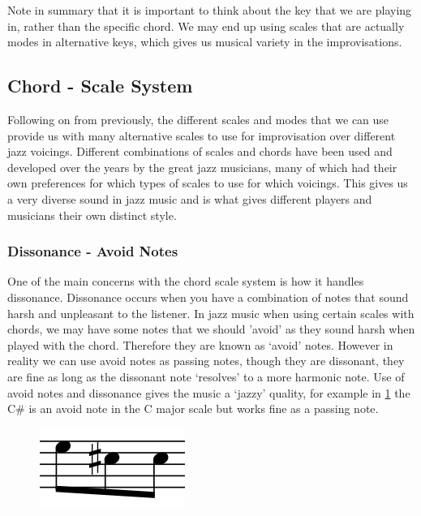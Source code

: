 \documentclass[pdftex,12pt,a4paper]{report}
\begin{document}
Note in summary that it is important to think about the key that we are playing in, rather than the specific chord. We may end up using scales that are actually modes in alternative keys, which gives us musical variety in the improvisations.

\subsection{Chord - Scale System}
Following on from previously, the different scales and modes that we can use provide us with many alternative scales to use for improvisation over different jazz voicings. Different combinations of scales and chords have been used and developed over the years by the great jazz musicians, many of which had their own preferences for which types of scales to use for which voicings. This gives us a very diverse sound in jazz music and is what gives different players and musicians their own distinct style. 

\subsubsection{Dissonance - Avoid Notes} \label{avoidnotes}
One of the main concerns with the chord scale system is how it handles dissonance. Dissonance occurs when you have a combination of notes that sound harsh and unpleasant to the listener. In jazz music when using certain scales with chords, we may have some notes that we should 'avoid' as they sound harsh when played with the chord. Therefore they are known as `avoid' notes. However in reality we can use avoid notes as passing notes, though they are dissonant, they are fine as long as the dissonant note `resolves' to a more harmonic note. Use of avoid notes and dissonance gives the music a `jazzy' quality, for example in \ref{fig:avoidexample} the C\# is an avoid note in the C major scale but works fine as a passing note.

\begin{figure}[here]
  \centering
  \includegraphics[scale=0.4]{figure/approachnormal.png}
  \label{fig:avoidexample}
\end{figure}
\end{document}
